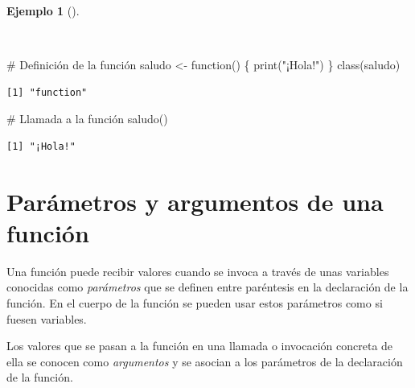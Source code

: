 \documentclass[
  a4paper,
]{scrreport}
\newenvironment{Shaded}{\begin{snugshade}}{\end{snugshade}}
\newcommand{\CommentTok}[1]{\textcolor[rgb]{0.37,0.37,0.37}{#1}}
\newcommand{\ControlFlowTok}[1]{\textcolor[rgb]{0.00,0.23,0.31}{#1}}
\newcommand{\FunctionTok}[1]{\textcolor[rgb]{0.28,0.35,0.67}{#1}}
\newcommand{\NormalTok}[1]{\textcolor[rgb]{0.00,0.23,0.31}{#1}}
\newcommand{\OtherTok}[1]{\textcolor[rgb]{0.00,0.23,0.31}{#1}}
\newcommand{\StringTok}[1]{\textcolor[rgb]{0.13,0.47,0.30}{#1}}
\theoremstyle{definition}
\theoremstyle{definition}
\newtheorem{example}{Ejemplo}[chapter]
\theoremstyle{remark}
\begin{document}
\begin{example}[]\protect\hypertarget{exm-creacion-funcion}{}\label{exm-creacion-funcion}

~

\begin{Shaded}
\begin{Highlighting}[]
\CommentTok{\# Definición de la función}
\NormalTok{saludo }\OtherTok{\textless{}{-}} \ControlFlowTok{function}\NormalTok{() \{}
  \FunctionTok{print}\NormalTok{(}\StringTok{"¡Hola!"}\NormalTok{)}
\NormalTok{\}}
\FunctionTok{class}\NormalTok{(saludo)}
\end{Highlighting}
\end{Shaded}

\begin{verbatim}
[1] "function"
\end{verbatim}

\begin{Shaded}
\begin{Highlighting}[]
\CommentTok{\# Llamada a la función}
\FunctionTok{saludo}\NormalTok{()}
\end{Highlighting}
\end{Shaded}

\begin{verbatim}
[1] "¡Hola!"
\end{verbatim}

\end{example}

\hypertarget{paruxe1metros-y-argumentos-de-una-funciuxf3n}{%
\section{Parámetros y argumentos de una
función}\label{paruxe1metros-y-argumentos-de-una-funciuxf3n}}

Una función puede recibir valores cuando se invoca a través de unas
variables conocidas como \emph{parámetros} que se definen entre
paréntesis en la declaración de la función. En el cuerpo de la función
se pueden usar estos parámetros como si fuesen variables.

Los valores que se pasan a la función en una llamada o invocación
concreta de ella se conocen como \emph{argumentos} y se asocian a los
parámetros de la declaración de la función.
\end{document}
